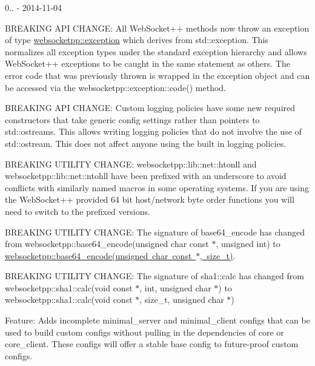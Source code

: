 0.. -\/ 2014-\/11-\/04
\begin{DoxyItemize}
\item B\+R\+E\+A\+K\+I\+NG A\+PI C\+H\+A\+N\+GE\+: All Web\+Socket++ methods now throw an exception of type {\ttfamily \mbox{\hyperlink{classwebsocketpp_1_1exception}{websocketpp\+::exception}}} which derives from {\ttfamily std\+::exception}. This normalizes all exception types under the standard exception hierarchy and allows Web\+Socket++ exceptions to be caught in the same statement as others. The error code that was previously thrown is wrapped in the exception object and can be accessed via the {\ttfamily websocketpp\+::exception\+::code()} method.
\item B\+R\+E\+A\+K\+I\+NG A\+PI C\+H\+A\+N\+GE\+: Custom logging policies have some new required constructors that take generic config settings rather than pointers to std\+::ostreams. This allows writing logging policies that do not involve the use of std\+::ostream. This does not affect anyone using the built in logging policies.
\item B\+R\+E\+A\+K\+I\+NG U\+T\+I\+L\+I\+TY C\+H\+A\+N\+GE\+: {\ttfamily websocketpp\+::lib\+::net\+::htonll} and {\ttfamily websocketpp\+::lib\+::net\+::ntohll} have been prefixed with an underscore to avoid conflicts with similarly named macros in some operating systems. If you are using the Web\+Socket++ provided 64 bit host/network byte order functions you will need to switch to the prefixed versions.
\item B\+R\+E\+A\+K\+I\+NG U\+T\+I\+L\+I\+TY C\+H\+A\+N\+GE\+: The signature of {\ttfamily base64\+\_\+encode} has changed from {\ttfamily websocketpp\+::base64\+\_\+encode(unsigned char const $\ast$, unsigned int)} to {\ttfamily \mbox{\hyperlink{namespacewebsocketpp_aff36d40583424a2c879df02219133af8}{websocketpp\+::base64\+\_\+encode(unsigned char const $\ast$, size\+\_\+t)}}}.
\item B\+R\+E\+A\+K\+I\+NG U\+T\+I\+L\+I\+TY C\+H\+A\+N\+GE\+: The signature of {\ttfamily sha1\+::calc} has changed from {\ttfamily websocketpp\+::sha1\+::calc(void const $\ast$, int, unsigned char $\ast$)} to {\ttfamily websocketpp\+::sha1\+::calc(void const $\ast$, size\+\_\+t, unsigned char $\ast$)}
\item Feature\+: Adds incomplete {\ttfamily minimal\+\_\+server} and {\ttfamily minimal\+\_\+client} configs that can be used to build custom configs without pulling in the dependencies of {\ttfamily core} or {\ttfamily core\+\_\+client}. These configs will offer a stable base config to future-\/proof custom configs.

\end{DoxyItemize}
